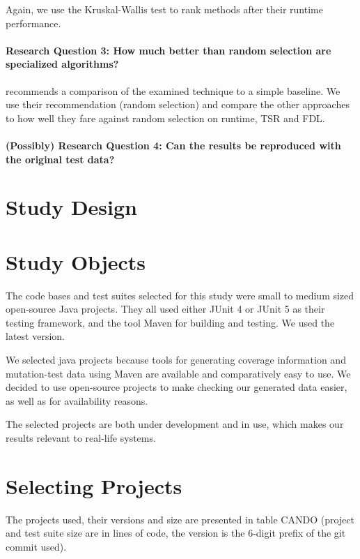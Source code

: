 Again, we use the Kruskal-Wallis test to rank methods after their
runtime performance.

\paragraph{Research Question 3: How much better than random selection are specialized algorithms?}

\cite{khan2018systematic} recommends a comparison of the examined
technique to a simple baseline. We use their recommendation (random
selection) and compare the other approaches to how well they fare against
random selection on runtime, TSR and FDL.

\paragraph{(Possibly) Research Question 4: Can the results be reproduced with the original test data?}

\section{Study Design}

\section{Study Objects}

The code bases and test suites selected for this study were small to
medium sized open-source Java projects. They all used either JUnit
4 or JUnit 5 as their testing framework, and the tool Maven %
for building and testing. We used the latest version.

We selected java projects because tools for generating coverage
information and mutation-test data using Maven are available and
comparatively easy to use. We decided to use open-source projects to make
checking our generated data easier, as well as for availability reasons.

The selected projects are both under development and in use, which makes
our results relevant to real-life systems.

\section{Selecting Projects}

The projects used, their versions and size are presented in table CANDO
(project and test suite size are in lines of code, the version is the
6-digit prefix of the git commit used).

